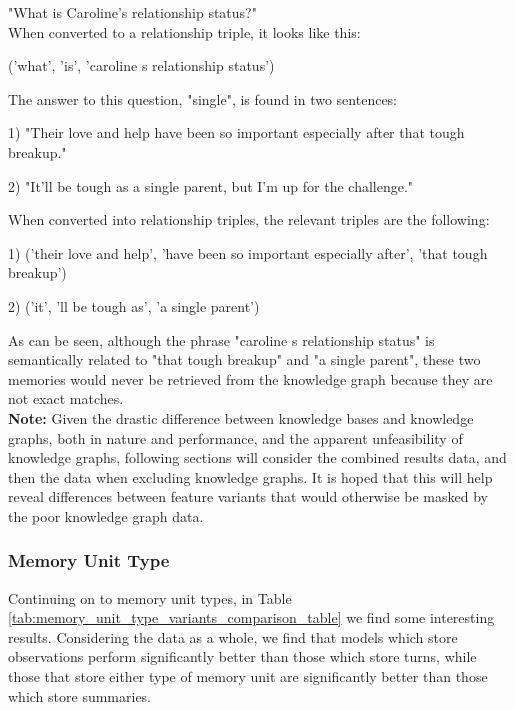 "What is Caroline's relationship status?"\\

\noindent When converted to a relationship triple, it looks like this:

\begin{displayquote}
('what', 'is', 'caroline s relationship status')
\end{displayquote}

\noindent The answer to this question, "single", is found in two sentences:

\begin{displayquote}
1) "Their love and help have been so important especially after that tough breakup."

2) "It'll be tough as a single parent, but I'm up for the challenge."
\end{displayquote}

\noindent When converted into relationship triples, the relevant triples are the following:

\begin{displayquote}
1) ('their love and help', 'have been so important especially after', 'that tough breakup')

2) ('it', 'll be tough as', 'a single parent')
\end{displayquote}

\noindent As can be seen, although the phrase "caroline s relationship status" is semantically related to "that tough breakup" and "a single parent", these two memories would never be retrieved from the knowledge graph because they are not exact matches.\\

\noindent \textbf{Note:} Given the drastic difference between knowledge bases and knowledge graphs, both in nature and performance, and the apparent unfeasibility of knowledge graphs, following sections will consider the combined results data, and then the data when excluding knowledge graphs. It is hoped that this will help reveal differences between feature variants that would otherwise be masked by the poor knowledge graph data.


\subsubsection{Memory Unit Type}

Continuing on to memory unit types, in Table \ref{tab:memory_unit_type_variants_comparison_table} we find some interesting results. Considering the data as a whole, we find that models which store observations perform significantly better than those which store turns, while those that store either type of memory unit are significantly better than those which store summaries.

